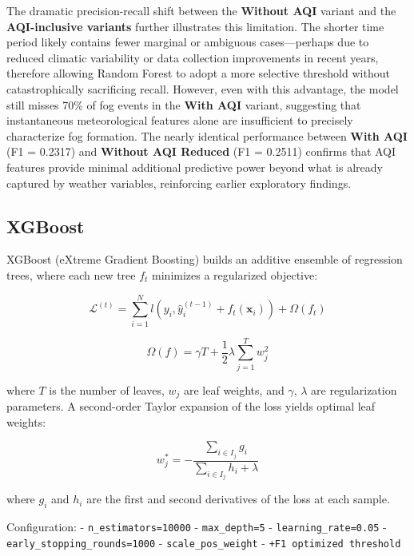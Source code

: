 \documentclass[
  letterpaper,
  DIV=11,
  numbers=noendperiod]{scrartcl}
\begin{document}
The dramatic precision-recall shift between the \textbf{Without AQI}
variant and the \textbf{AQI-inclusive variants} further illustrates this
limitation. The shorter time period likely contains fewer marginal or
ambiguous cases---perhaps due to reduced climatic variability or data
collection improvements in recent years, therefore allowing Random
Forest to adopt a more selective threshold without catastrophically
sacrificing recall. However, even with this advantage, the model still
misses 70\% of fog events in the \textbf{With AQI} variant, suggesting
that instantaneous meteorological features alone are insufficient to
precisely characterize fog formation. The nearly identical performance
between \textbf{With AQI} (F1 = 0.2317) and \textbf{Without AQI Reduced}
(F1 = 0.2511) confirms that AQI features provide minimal additional
predictive power beyond what is already captured by weather variables,
reinforcing earlier exploratory findings.

\subsection{XGBoost}\label{xgboost}

XGBoost (eXtreme Gradient Boosting) builds an additive ensemble of
regression trees, where each new tree \(f_t\) minimizes a regularized
objective:

\[\mathcal{L}^{(t)} = \sum_{i=1}^{N} l\left(y_i, \hat{y}_i^{(t-1)} + f_t(\mathbf{x}_i)\right) + \Omega(f_t)\]

\[\Omega(f) = \gamma T + \frac{1}{2} \lambda \sum_{j=1}^{T} w_j^2\]

where \(T\) is the number of leaves, \(w_j\) are leaf weights, and
\(\gamma\), \(\lambda\) are regularization parameters. A second-order
Taylor expansion of the loss yields optimal leaf weights:

\[w_j^* = -\frac{\sum_{i \in I_j} g_i}{\sum_{i \in I_j} h_i + \lambda}\]

where \(g_i\) and \(h_i\) are the first and second derivatives of the
loss at each sample.

Configuration: - \texttt{n\_estimators=10000} - \texttt{max\_depth=5} -
\texttt{learning\_rate=0.05} - \texttt{early\_stopping\_rounds=1000} -
\texttt{scale\_pos\_weight} - \texttt{+F1\ optimized\ threshold}
\end{document}

